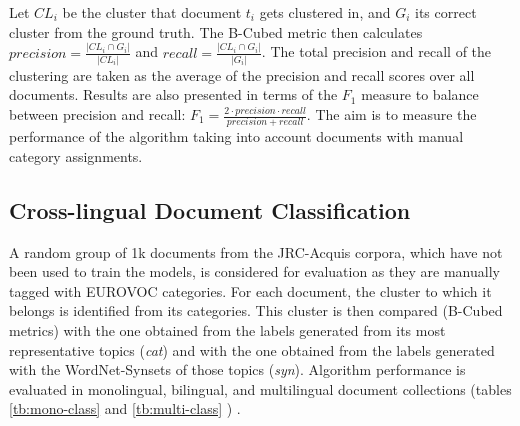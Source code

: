 Let $CL_i$ be the cluster that document $t_i$ gets clustered in, and $G_i$ its correct cluster from the ground truth. The B-Cubed metric then calculates $precision=\frac{|CL_i \cap G_i|}{|CL_i|}$ and $recall=\frac{|CL_i \cap G_i|}{|G_i|}$. The total precision and recall of the clustering are taken as the average of the precision and recall scores over all documents. Results are also presented in terms of the $F_1$ measure to balance between precision and recall: $F_1=\frac{2 \cdot precision \cdot recall}{precision + recall}$. The aim is to measure the performance of the algorithm taking into account documents with manual category assignments.

\subsection{Cross-lingual Document Classification}
A random group of 1k documents from the JRC-Acquis corpora, which have not been used to train the models, is considered for evaluation as they are manually tagged with EUROVOC categories. For each document, the cluster to which it belongs is identified from its categories. This cluster is then compared (B-Cubed metrics) with the one obtained from the labels generated from its most representative topics (\textit{cat}) and with the one obtained from the labels generated with the WordNet-Synsets of those topics (\textit{syn}). Algorithm performance is evaluated in monolingual, bilingual, and multilingual document collections (tables \ref{tb:mono-class} and \ref{tb:multi-class} ) .

